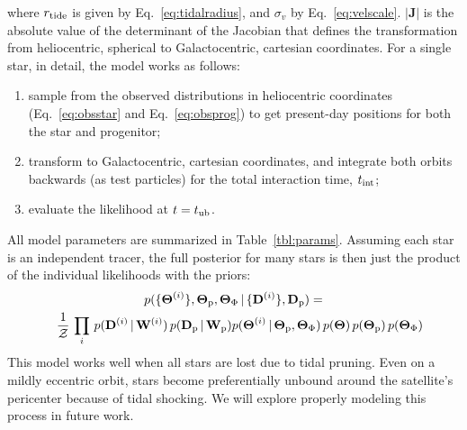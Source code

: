 \documentclass[letterpaper,12pt,preprint]{aastex}
\newcommand{\given}{\,|\,}
\newcommand{\D}{{\bf D}}
\newcommand{\W}{{\bf W}}
\newcommand{\J}{{\boldsymbol J}}
\newcommand{\rtide}{r_{\rm tide}}
\newcommand{\bs}{\boldsymbol}
\newcommand{\sat}{{\rm p}}
\newcommand{\tub}{t_{\rm ub}}
\newcommand{\tint}{t_{\rm int}}
\newcommand{\tailbit}{\beta}
\newcommand{\Loffset}{\alpha}
\begin{document}
where $\rtide$ is given by Eq.~\ref{eq:tidalradius}, and $\sigma_v$ by Eq.~\ref{eq:velscale}. $\left\vert\J\right\vert$ is the absolute value of the determinant of the Jacobian that defines the transformation from heliocentric, spherical to Galactocentric, cartesian coordinates. For a single star, in detail, the model works as follows:
\begin{enumerate}
	\item sample from the observed distributions in heliocentric coordinates (Eq.~\ref{eq:obsstar} and Eq.~\ref{eq:obsprog}) to get present-day positions for both the star and progenitor;
	\item transform to Galactocentric, cartesian coordinates, and integrate both orbits backwards (as test particles) for the total interaction time, $\tint$;
	\item evaluate the likelihood at $t=\tub$.
\end{enumerate}
All model parameters are summarized in Table~\ref{tbl:params}. Assuming each star is an independent tracer, the full posterior for many stars is then just the product of the individual likelihoods with the priors:
\begin{multline}
	p(\{\bs{\Theta}^{(i)}\}, \bs{\Theta}_\sat, \bs{\Theta}_\Phi \given \{\D^{(i)}\}, \D_\sat) = \\
		\shoveleft{\frac{1}{\mathcal{Z}} \, \prod_i \, p(\D^{(i)} \given \W^{(i)}) \, p(\D_\sat \given \W_\sat)} 
			p(\bs{\Theta}^{(i)} \given \bs{\Theta}_\sat, \bs{\Theta}_\Phi) \, 
			p(\bs{\Theta}) \, p(\bs{\Theta}_\sat)\,p(\bs{\Theta}_\Phi)
\end{multline}
This model works well when all stars are lost due to tidal pruning. Even on a mildly eccentric orbit, stars become preferentially unbound around the satellite's pericenter because of tidal shocking. We will explore properly modeling this process in future work. 
\end{document}
